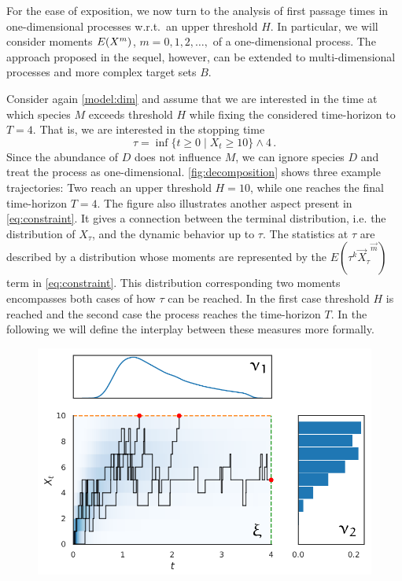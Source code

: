 For the ease of exposition, we now turn to the analysis of first
passage times in
one-dimensional processes w.r.t.\ an upper threshold $H$. In particular,
we will consider  moments ${E}(X^m)$, $m=0,1,2,\dots,$ of a
one-dimensional process.
The   approach proposed in the sequel, however,
can be extended to multi-dimensional processes and more complex target sets $B$.

\begin{example}
  Consider again \autoref{model:dim} and assume that we are interested in the
  time at which species $M$ exceeds  threshold $H$ while fixing the
  considered time-horizon to
  $T=4$. That is, we are interested in the stopping time
  \[
    \tau=\inf\{t\geq 0\mid X_t\geq 10\}\land 4\,.
  \]
  Since the abundance of $D$ does not influence $M$, we can ignore
  species $D$ and treat the process as one-dimensional.
  \autoref{fig:decomposition} shows three example trajectories:
  Two reach an upper threshold $H=10$, while one reaches the final
  time-horizon $T=4$.
  The figure also illustrates another aspect present in \eqref{eq:constraint}.
  It gives a connection between the terminal distribution, i.e. the
  distribution of $X_{\tau}$,
  and the dynamic behavior up to $\tau$.
  The statistics at $\tau$ are described by a distribution whose
  moments are represented by the
  $E(\tau^k{\vec{X}_{\tau}}^{\vec{m}})$ term in \eqref{eq:constraint}.
  This distribution corresponding two moments encompasses both cases of how
  $\tau$ can be reached. In the first case threshold $H$ is reached
  and the second case the process reaches the time-horizon $T$.
  In the following we will define the interplay between these
  measures more formally.
  \begin{figure}[htb]
    \centering
    \includegraphics[scale=.8]{gfx/decomp1.pdf}

\end{figure}
\end{example}
